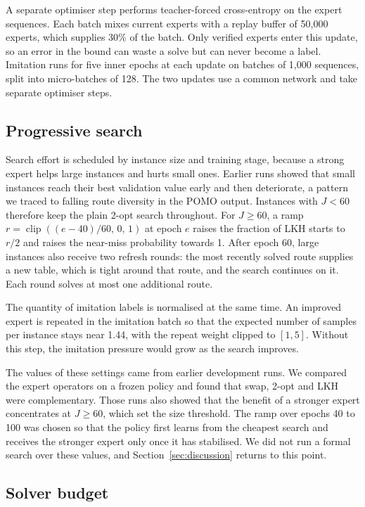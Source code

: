 \documentclass[preprint,12pt,authoryear]{elsarticle}
\begin{document}
A separate optimiser step performs teacher-forced cross-entropy on the expert sequences. Each batch mixes current experts with a replay buffer of 50,000 experts, which supplies 30\% of the batch. Only verified experts enter this update, so an error in the bound can waste a solve but can never become a label. Imitation runs for five inner epochs at each update on batches of 1,000 sequences, split into micro-batches of 128. The two updates use a common network and take separate optimiser steps.

\subsection{Progressive search}
\label{sec:recipe}

Search effort is scheduled by instance size and training stage, because a strong expert helps large instances and hurts small ones. Earlier runs showed that small instances reach their best validation value early and then deteriorate, a pattern we traced to falling route diversity in the POMO output. Instances with $J < 60$ therefore keep the plain 2-opt search throughout. For $J \ge 60$, a ramp $r = \operatorname{clip}((e - 40)/60,\, 0,\, 1)$ at epoch $e$ raises the fraction of LKH starts to $r/2$ and raises the near-miss probability towards 1. After epoch 60, large instances also receive two refresh rounds: the most recently solved route supplies a new table, which is tight around that route, and the search continues on it. Each round solves at most one additional route.

The quantity of imitation labels is normalised at the same time. An improved expert is repeated in the imitation batch so that the expected number of samples per instance stays near 1.44, with the repeat weight clipped to $[1, 5]$. Without this step, the imitation pressure would grow as the search improves.

The values of these settings came from earlier development runs. We compared the expert operators on a frozen policy and found that swap, 2-opt and LKH were complementary. Those runs also showed that the benefit of a stronger expert concentrates at $J \ge 60$, which set the size threshold. The ramp over epochs 40 to 100 was chosen so that the policy first learns from the cheapest search and receives the stronger expert only once it has stabilised. We did not run a formal search over these values, and Section~\ref{sec:discussion} returns to this point.

\subsection{Solver budget}
\end{document}
